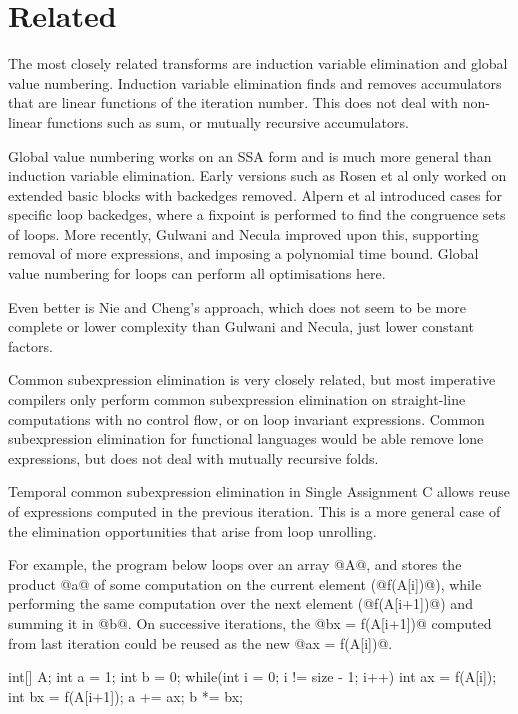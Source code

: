 \section{Related}
\label{s:Related}

The most closely related transforms are induction variable elimination\cite{shivers1988control} and global value numbering\cite{rosen1988global}.
Induction variable elimination finds and removes accumulators that are linear functions of the iteration number.
This does not deal with non-linear functions such as sum, or mutually recursive accumulators.

Global value numbering works on an SSA form and is much more general than induction variable elimination.
Early versions such as Rosen et al\cite{rosen1988global} only worked on extended basic blocks with backedges removed.
Alpern et al\cite{alpern1988detecting} introduced cases for specific loop backedges, where a fixpoint is performed to find the congruence sets of loops.
More recently, Gulwani and Necula\cite{gulwani2004polynomial} improved upon this, supporting removal of more expressions, and imposing a polynomial time bound.
Global value numbering for loops can perform all optimisations here.

Even better is Nie and Cheng's approach\cite{nie2007efficient}, which does not seem to be more complete or lower complexity than Gulwani and Necula, just lower constant factors.

Common subexpression elimination is very closely related, but most imperative compilers only perform common subexpression elimination on straight-line computations with no control flow\cite{debray1992compiler}, or on loop invariant expressions\cite{bodik1998complete}.
Common subexpression elimination for functional languages would be able remove lone expressions, but does not deal with mutually recursive folds.

Temporal common subexpression elimination in Single Assignment C
allows reuse of expressions computed in the previous iteration\cite{imlig2001loop}.
This is a more general case of the elimination opportunities that arise from loop unrolling.

For example, the program below loops over an array @A@, and stores the product @a@ of some computation on the current element (@f(A[i])@), while performing the same computation over the next element (@f(A[i+1])@) and summing it in @b@.
On successive iterations, the @bx = f(A[i+1])@ computed from last iteration could be reused as the new @ax = f(A[i])@.
\begin{code}
int[] A;
int a = 1;
int b = 0;
while(int i = 0; i != size - 1; i++)  {
  int ax = f(A[i]);
  int bx = f(A[i+1]);
  a += ax;
  b *= bx;
}
\end{code}

